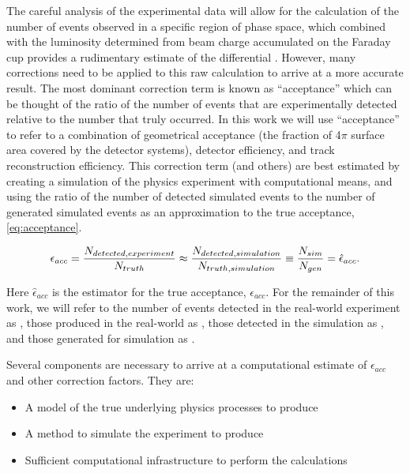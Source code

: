 The careful analysis of the experimental data will allow for the calculation of the number of events observed in a specific region of phase space, which combined with the luminosity determined from beam charge accumulated on the Faraday cup provides a rudimentary estimate of the differential \xsec. However, many corrections need to be applied to this raw calculation to arrive at a more accurate result. The most dominant correction term is known as ``acceptance'' which can be thought of the ratio of the number of events that are experimentally detected relative to the number that truly occurred. In this work we will use ``acceptance'' to refer to a combination of geometrical acceptance (the fraction of 4$\pi$ surface area covered by the detector systems), detector efficiency, and track reconstruction efficiency. This correction term (and others) are best estimated by creating a simulation of the physics experiment with computational means, and using the ratio of the number of detected simulated events to the number of generated simulated events as an approximation to the true acceptance, \eqref{eq:acceptance}. 



  \begin{equation}\labelAndRemember{eq:acceptance}
                   {\epsilon_{acc} = \frac{N_{detected,experiment}}{N_{truth}} \approx  \frac{N_{detected,simulation}}{N_{truth,simulation}}  \equiv \frac{N_{sim}}{N_{gen}} = \hat{\epsilon}_{acc}}.
             \end{equation}      
             

Here $\hat{\epsilon}_{acc}$ is the estimator for the true acceptance, $\epsilon_{acc}$. For the remainder of this work, we will refer to the number of events detected in the real-world experiment as \Nexp, those produced in the real-world as \Ntruth, those detected in the simulation as \Nsim, and those generated for simulation as \Ngen.  

Several components are necessary to arrive at a computational estimate of $\epsilon_{acc}$ and other correction factors. They are: 

\begin{itemize}
    \item A model of the true underlying physics processes to produce \Ngen {}
    \item A method to simulate the experiment to produce \Nsim {}
    \item Sufficient computational infrastructure to perform the calculations 
\end{itemize}



